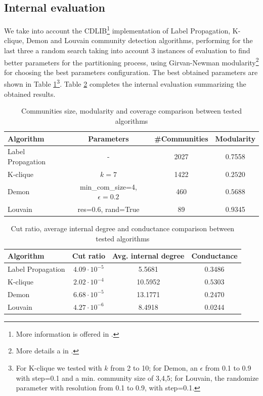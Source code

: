 \documentclass[sigchi]{acmart}
\begin{document}
\subsection{Internal evaluation}
We take into account the CDLIB\footnote{More information is offered in \cite{rossettih}.} implementation of Label Propagation, K-clique, Demon and Louvain community detection algorithms, performing for the last three a random search taking into account 3 instances of evaluation to find better parameters for the partitioning process, using Girvan-Newman modularity\footnote{More details a in \cite{girnew}.} for choosing the best parameters configuration. The best obtained parameters are shown in Table \ref{table:params_cdlib}\footnote{For K-clique we tested with $k$ from 2 to 10; for Demon, an $\epsilon$ from 0.1 to 0.9 with step=0.1 and a min. community size of 3,4,5; for Louvain, the randomize parameter with resolution from 0.1 to 0.9, with step=0.1.}. Table \ref{table:params_cdlib_2} completes the internal evaluation summarizing the obtained results.

\renewcommand{\arraystretch}{1.1}
\begin{table}[H]
\begin{center}
\scriptsize
\begin{tabular}{ |l|c|c|c| } 
 \hline
 \textbf{Algorithm} & \textbf{Parameters} & \textbf{\#Communities} & \textbf{Modularity}\\
 \hline
Label Propagation & - & 2027  & 0.7558 \\
 K-clique & $k=7$ & 1422  & $0.2520$\\
 Demon &  {min\_com\_size}=4, $\epsilon=0.2$ & 460 & $0.5688$\\
 Louvain &  res=0.6, rand=True & 89  & 0.9345\\
 
 \hline
\end{tabular}
\end{center}
\caption{\label{table:params_cdlib} Communities size, modularity and coverage comparison between tested algorithms}
\end{table}

\renewcommand{\arraystretch}{1.1}
\begin{table}[H]
\begin{center}
\scriptsize
\begin{tabular}{ |l|c|c|c| } 
 \hline
 \textbf{Algorithm} & \textbf{Cut ratio} & \textbf{Avg. internal degree} & \textbf{Conductance}\\
 \hline
Label Propagation & $4.09\cdot10^{-5}$ & 5.5681  & 0.3486 \\
 K-clique & $2.02\cdot10^{-4}$ & 10.5952  & $0.5303$\\
 Demon &  $6.68\cdot10^{-5}$ & 13.1771 & $0.2470$\\
 Louvain &  $4.27\cdot10^{-6}$ & 8.4918  & 0.0244\\
 
 \hline
\end{tabular}
\end{center}
\caption{\label{table:params_cdlib_2} Cut ratio, average internal degree and conductance comparison between tested algorithms}
\end{table}
\end{document}
